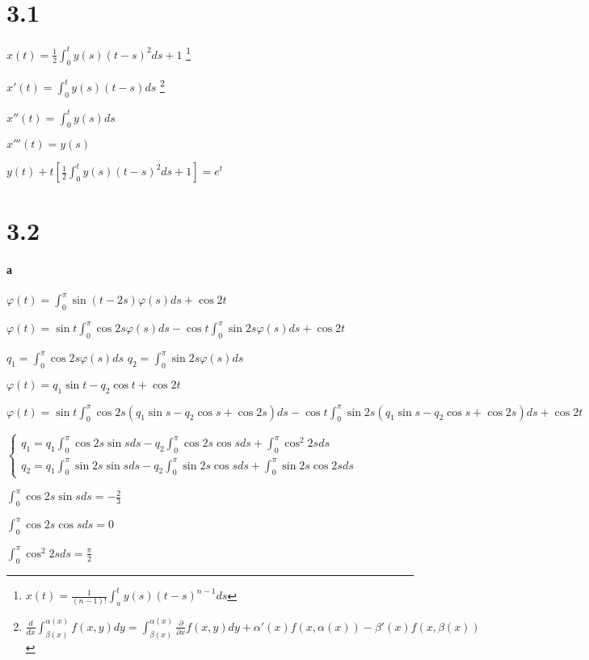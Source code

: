 \documentclass[russian]{article}
\begin{document}
\section*{3.1}

$x(t)=\frac{1}{2}\int_0^t y(s)(t-s)^2 d s + 1$
\footnote{
	$x(t) = \frac{1}{(n-1)!} \int_a^t y(s)(t-s)^{n-1}ds$
}

$x'(t) = \int_0^t y(s)(t-s)ds$
\footnote{
	$\frac{d}{d x} \int_{\beta(x)}^{\alpha(x)}f(x,y) d y = \int_{\beta(x)}^{\alpha(x)}\frac{\partial}{\partial x}f(x, y) d y + \alpha ' (x) f(x,\alpha(x)) - \beta ' (x) f(x, \beta (x))$
}

$x''(t) = \int_0^t y(s) ds$

$x'''(t) = y(s)$

$y(t) + t[\frac{1}{2}\int_0^t y(s)(t-s)^2 ds + 1] = e^t$

\section*{3.2}

\paragraph*{а}

$\varphi(t) = \int _ 0 ^ \pi \sin(t-2s)\varphi(s)ds + \cos 2t$

$\varphi(t) = \sin t \int _0^\pi \cos 2s \varphi(s) ds - \cos t \int _0^\pi \sin 2s \varphi(s) ds + \cos 2t$

$q_1 = \int _0^\pi \cos 2s \varphi(s) ds$
$q_2 = \int _0^\pi \sin 2s \varphi(s) ds$

$\varphi(t) = q_1 \sin t - q_2 \cos t + \cos 2t$

$\varphi(t) = \sin t \int _0^\pi \cos 2s (q_1 \sin s - q_2 \cos s + \cos 2s) ds - \cos t \int _0^\pi \sin 2s (q_1 \sin s - q_2 \cos s + \cos 2s) ds + \cos 2t$

$\begin{cases}
q_1 = q_1 \int _0^\pi \cos 2s \sin s ds - q_2 \int_0^\pi \cos 2s \cos s ds + \int _0^\pi       \cos ^2 2s ds\\
q_2 = q_1 \int _0^\pi \sin 2s \sin s ds - q_2 \int _0^\pi \sin 2s \cos s ds + \int _0^\pi \sin 2s \cos 2s ds
\end{cases}$

$\int _0^\pi \cos 2s \sin s ds = - \frac{2}{3}$

$\int_0^\pi \cos 2s \cos s ds = 0 $

$\int _0^\pi \cos ^2 2s ds = \frac{\pi}{2}$
\end{document}
